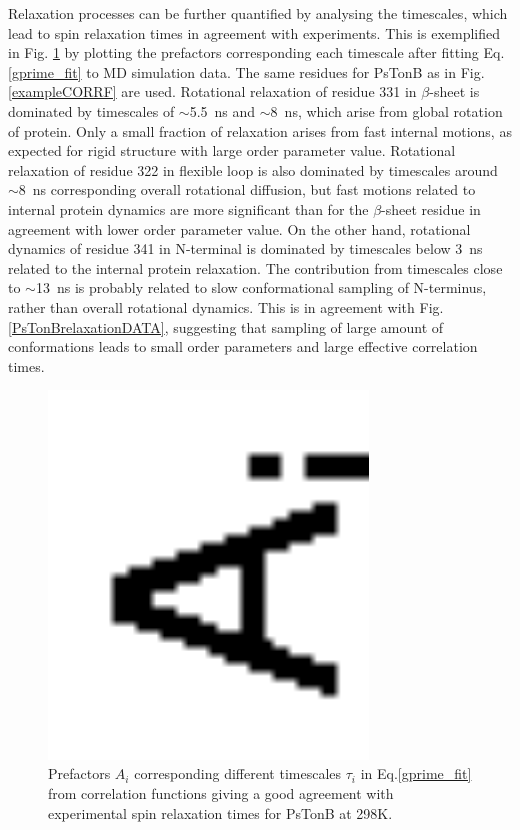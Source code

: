 \documentclass[pre,aps,floatfix,authordate1-4,twocolumn]{revtex4-1}
\begin{document}
Relaxation processes can be further quantified by analysing the timescales,
which lead to spin relaxation times in agreement with experiments.
This is exemplified in Fig. \ref{coeffsPLOT} by plotting the prefactors corresponding
each timescale after fitting Eq. \ref{gprime_fit} to MD simulation data. 
The same residues for PsTonB as in Fig. \ref{exampleCORRF} are used.
Rotational relaxation of residue 331 in $\beta$-sheet is dominated
by timescales of $\sim$5.5~ns and $\sim$8~ns, which arise from global rotation
of protein. Only a small fraction of relaxation arises from fast internal motions,
as expected for rigid structure with large order parameter value. Rotational
relaxation of residue 322 in flexible loop is also dominated by timescales
around $\sim$8~ns corresponding overall rotational diffusion, but fast motions
related to internal protein dynamics are more significant than for the $\beta$-sheet
residue in agreement with lower order parameter value. On the other hand,
rotational dynamics of residue 341 in N-terminal is dominated by timescales
below 3~ns related to the internal protein relaxation. The contribution from timescales
close to $\sim$13~ns is probably related to slow conformational sampling of
N-terminus, rather than overall rotational dynamics. This is in agreement with
Fig. \ref{PsTonBrelaxationDATA}, suggesting that sampling of large amount of
conformations leads to small order parameters and large effective correlation times.
\begin{figure}[!h]
  \includegraphics[width=8.5cm]{../Figs/coeffsPLOT.eps}%
  \caption{Prefactors $A_i$ corresponding different timescales $\tau_i$ in Eq.\ref{gprime_fit}
    from correlation functions giving a good agreement with experimental spin relaxation times
    for PsTonB at 298K. 
    \label{coeffsPLOT}}%
\end{figure}
\end{document}
